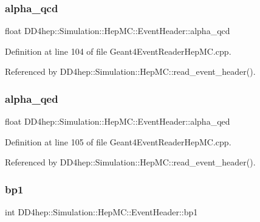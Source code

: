 \subsubsection{\texorpdfstring{alpha\+\_\+qcd}{alpha\_qcd}}
{\footnotesize\ttfamily float D\+D4hep\+::\+Simulation\+::\+Hep\+M\+C\+::\+Event\+Header\+::alpha\+\_\+qcd}



Definition at line 104 of file Geant4\+Event\+Reader\+Hep\+M\+C.\+cpp.



Referenced by D\+D4hep\+::\+Simulation\+::\+Hep\+M\+C\+::read\+\_\+event\+\_\+header().

\hypertarget{class_d_d4hep_1_1_simulation_1_1_hep_m_c_1_1_event_header_a6ca0fb3012c13d65f7bc3ea095d41a73}{}\label{class_d_d4hep_1_1_simulation_1_1_hep_m_c_1_1_event_header_a6ca0fb3012c13d65f7bc3ea095d41a73} 
\subsubsection{\texorpdfstring{alpha\+\_\+qed}{alpha\_qed}}
{\footnotesize\ttfamily float D\+D4hep\+::\+Simulation\+::\+Hep\+M\+C\+::\+Event\+Header\+::alpha\+\_\+qed}



Definition at line 105 of file Geant4\+Event\+Reader\+Hep\+M\+C.\+cpp.



Referenced by D\+D4hep\+::\+Simulation\+::\+Hep\+M\+C\+::read\+\_\+event\+\_\+header().

\hypertarget{class_d_d4hep_1_1_simulation_1_1_hep_m_c_1_1_event_header_a5c029c436a958d9903c9296823ed2195}{}\label{class_d_d4hep_1_1_simulation_1_1_hep_m_c_1_1_event_header_a5c029c436a958d9903c9296823ed2195} 
\subsubsection{\texorpdfstring{bp1}{bp1}}
{\footnotesize\ttfamily int D\+D4hep\+::\+Simulation\+::\+Hep\+M\+C\+::\+Event\+Header\+::bp1}



